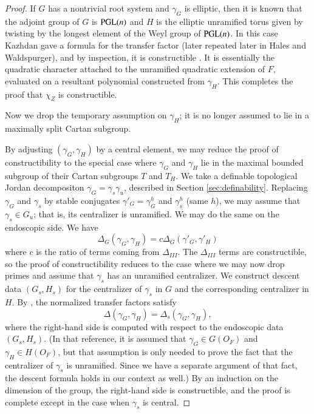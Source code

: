 \begin{proof}
If $G$ has a nontrivial root system and $\gamma_G$ is elliptic, then it is known that the adjoint group of $G$ is ${\operatorname{PGL}}(n)$ and $H$ is the elliptic
unramified torus given by twisting by the longest element of the Weyl group of ${\operatorname{PGL}}(n)$.  In this case Kazhdan gave a formula for the transfer factor 
(later repeated later in Hales and Waldspurger), and by inspection, it is constructible \cite{kazhdan1983lifting}.  It is essentially the
quadratic character attached to the unramified quadratic extension of $F$,
evaluated on a resultant polynomial constructed from $\gamma_H$.   This completes the proof that $\chi_Z$ is constructible.

Now we drop the temporary assumption on $\gamma_H$; it is no longer assumed to lie in a maximally split Cartan subgroup.


By adjusting $(\gamma_G,\gamma_H)$ by a central element, we may reduce the proof of constructibility to the special case  where $\gamma_G$ and
$\gamma_H$ lie in the maximal bounded subgroup of their Cartan subgroups $T$ and $T_H$.
We take a definable topological Jordan decompositon $\gamma_G = \gamma_s \gamma_u$, described in Section \ref{sec:definability}.
Replacing $\gamma_G$ and $\gamma_s$ by stable conjugates $\gamma'_G=\gamma_G^h$ and $\gamma_s^h$ (same $h$), we may assume that
$\gamma_s\in G_u$; that is, its centralizer is unramified.  We may do the same on the endoscopic side.  We have 
\[
\Delta_G(\gamma_G,\gamma_H) = c \Delta_G(\gamma'_G,\gamma'_H)
\]
where $c$ is the ratio of terms coming from $\Delta_{III}$.  The $\Delta_{III}$ terms are constructible, so the proof of constructibility reduces to
the case where we may now drop primes and assume that $\gamma_s$ has an unramified centralizer.
We construct descent data $(G_s,H_s)$ for the centralizer of $\gamma_s$ in $G$ and the corresponding centralizer in $H$.
By \cite{hales1993simple}, the normalized transfer factors satisfy
\[
\Delta(\gamma_G,\gamma_H) = \Delta_s(\gamma_G,\gamma_H),
\]
where the right-hand side is computed with respect to the endoscopic data $(G_s,H_s)$.
(In that reference, it is assumed that $\gamma_G\in G(O_F)$ and $\gamma_H\in H(O_F)$, but that assumption is only needed 
to prove the fact that the centralizer of $\gamma_s$ is unramified.  Since we have a separate argument of that fact, the descent formula
holds in our context as well.)
By an induction on the dimension of the group, the right-hand side is constructible, and the proof is complete except in the case
when $\gamma_s$ is central.


\end{proof}
